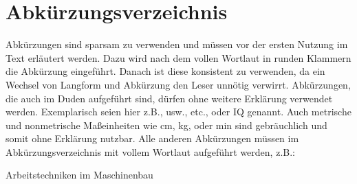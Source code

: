 \pagestyle{plain}
\chapter*{Abkürzungsverzeichnis}

\noindent Abkürzungen sind sparsam zu verwenden und müssen vor der ersten Nutzung im Text erläutert werden. Dazu wird nach dem vollen Wortlaut in runden Klammern die Abkürzung eingeführt. 
Danach ist diese konsistent zu verwenden, da ein Wechsel von Langform und Abkürzung den Leser unnötig verwirrt. 
Abkürzungen, die auch im Duden aufgeführt sind, dürfen ohne weitere Erklärung verwendet werden. 
Exemplarisch seien hier z.B., usw., etc., oder IQ genannt. Auch metrische und nonmetrische Maßeinheiten wie cm, kg, oder min sind gebräuchlich und somit ohne Erklärung nutzbar. 
Alle anderen Abkürzungen müssen im Abkürzungsverzeichnis mit vollem Wortlaut aufgeführt werden, z.B.:

\begin{acronym}[DGPs]
	 {Arbeitstechniken im Maschinenbau}
\end{acronym}